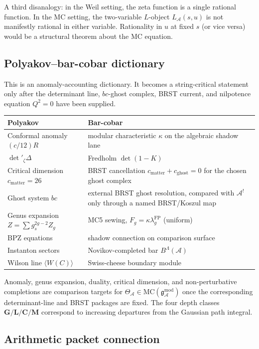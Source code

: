\documentclass[11pt,reqno]{amsart}
\theoremstyle{definition}
\theoremstyle{remark}
\providecommand{\cA}{\mathcal{A}}
\providecommand{\MC}{\mathrm{MC}}
\providecommand{\gAmod}{\mathfrak{g}^{\mathrm{mod}}_\cA}
\providecommand{\FP}{\mathrm{FP}}
\providecommand{\FP}{\mathrm{FP}}
\numberwithin{equation}{section}
\begin{document}
A third disanalogy: in the Weil setting, the zeta function is a
single rational function. In the MC setting, the
two-variable $L$-object $L_\cA(s, u)$ is not manifestly rational
in either variable. Rationality in $u$ at fixed $s$ (or vice
versa) would be a structural theorem about the MC equation.

\subsection*{Polyakov--bar-cobar dictionary}

This is an anomaly-accounting dictionary. It becomes a string-critical
statement only after the determinant line, \(bc\)-ghost complex, BRST
current, and nilpotence equation \(Q^2=0\) have been supplied.

\begin{center}
\small
\renewcommand{\arraystretch}{1.1}
\begin{tabular}{ll}
\textbf{Polyakov} & \textbf{Bar-cobar}\\ \hline
Conformal anomaly $(c/12)R$ & modular characteristic $\kappa$ on the
algebraic shadow lane\\
$\det'_\zeta \Delta$ & Fredholm $\det(1 - K)$\\
Critical dimension $c_{\mathrm{matter}} = 26$
& BRST cancellation
\(c_{\mathrm{matter}}+c_{\mathrm{ghost}}=0\) for the chosen ghost
complex\\
Ghost system $bc$ & external BRST ghost resolution, compared with
$\cA^!$ only through a named BRST/Koszul map\\
Genus expansion $Z = \sum g_s^{2g-2}Z_g$
 & MC5 sewing, $F_g = \kappa\lambda_g^{\FP}$ (uniform)\\
BPZ equations & shadow connection on comparison surface\\
Instanton sectors & Novikov-completed bar $B^\Lambda(\cA)$\\
Wilson line $\langle W(C)\rangle$ & Swiss-cheese boundary module
\end{tabular}
\end{center}
Anomaly, genus expansion, duality, critical dimension, and
non-perturbative completions are comparison targets for
$\Theta_\cA \in \MC(\gAmod)$ once the corresponding determinant-line
and BRST packages are fixed. The four depth classes
$\mathbf G/\mathbf L/\mathbf C/\mathbf M$ correspond to
increasing departures from the Gaussian path integral.

\subsection*{Arithmetic packet connection}
\end{document}
